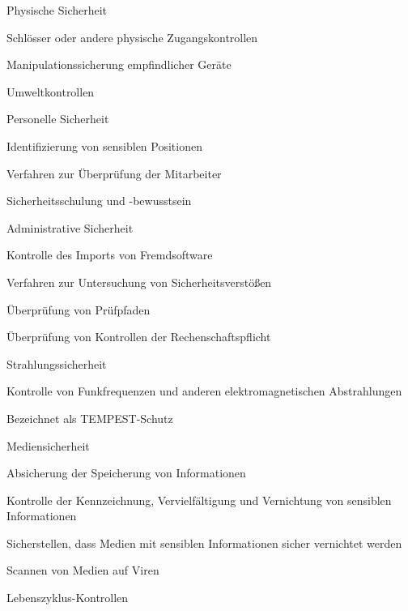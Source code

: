 \documentclass[a4paper]{article}
\begin{document}
\begin{multicols}{3}
      \begin{itemize*}
            \item
            Physische Sicherheit

            \begin{itemize*}
                  \item Schlösser oder andere physische Zugangskontrollen
                  \item Manipulationssicherung empfindlicher Geräte
                  \item Umweltkontrollen
            \end{itemize*}
            \item
            Personelle Sicherheit

            \begin{itemize*}
                  \item Identifizierung von sensiblen Positionen
                  \item Verfahren zur Überprüfung der Mitarbeiter
                  \item Sicherheitsschulung und -bewusstsein
            \end{itemize*}
            \item
            Administrative Sicherheit

            \begin{itemize*}
                  \item Kontrolle des Imports von Fremdsoftware
                  \item Verfahren zur Untersuchung von Sicherheitsverstößen
                  \item Überprüfung von Prüfpfaden
                  \item Überprüfung von Kontrollen der Rechenschaftspflicht
            \end{itemize*}
            \item
            Strahlungssicherheit

            \begin{itemize*}
                  \item Kontrolle von Funkfrequenzen und anderen elektromagnetischen Abstrahlungen
                  \item Bezeichnet als TEMPEST-Schutz
            \end{itemize*}
            \item
            Mediensicherheit

            \begin{itemize*}
                  \item Absicherung der Speicherung von Informationen
                  \item Kontrolle der Kennzeichnung, Vervielfältigung und Vernichtung von sensiblen Informationen
                  \item Sicherstellen, dass Medien mit sensiblen Informationen sicher vernichtet werden
                  \item Scannen von Medien auf Viren
            \end{itemize*}
            \item
            Lebenszyklus-Kontrollen


\end{itemize*}
\end{multicols}
\end{document}
